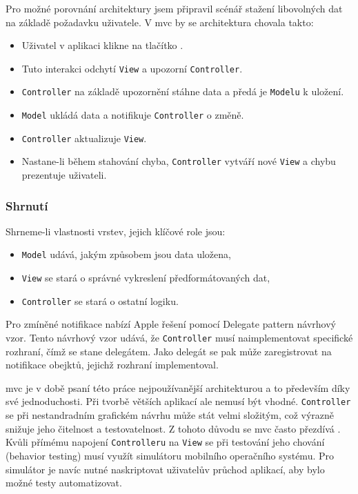 Pro možné porovnání architektury jsem připravil scénář stažení libovolných dat na základě požadavku uživatele.
V \acrshort{mvc} by se architektura chovala takto:

\begin{itemize}
  \item Uživatel v aplikaci klikne na tlačítko .
  \item Tuto interakci odchytí \texttt{View} a upozorní \texttt{Controller}.
  \item \texttt{Controller} na základě upozornění stáhne data a předá je \texttt{Modelu} k uložení.
  \item \texttt{Model} ukládá data a notifikuje \texttt{Controller} o změně.
  \item \texttt{Controller} aktualizuje \texttt{View}.
  \item Nastane-li během stahování chyba, \texttt{Controller} vytváří nové \texttt{View} a chybu prezentuje uživateli.
\end{itemize}


\subsubsection*{Shrnutí}

Shrneme-li vlastnosti vrstev, jejich klíčové role jsou:

\begin{itemize}
  \item \texttt{Model} udává, jakým způsobem jsou data uložena,
  \item \texttt{View} se stará o správné vykreslení předformátovaných dat,
  \item \texttt{Controller} se stará o ostatní logiku.
\end{itemize}


Pro zmíněné notifikace nabízí Apple řešení pomocí Delegate pattern návrhový vzor.
Tento návrhový vzor udává, že \texttt{Controller} musí naimplementovat specifické rozhraní, čímž se stane delegátem.
Jako delegát se pak může zaregistrovat na notifikace obejktů, jejichž rozhraní implementoval.

\acrshort{mvc} je v době psaní této práce nejpoužívanější architekturou a to především díky své jednoduchosti.
Při tvorbě větších aplikací ale nemusí být vhodné.
\texttt{Controller} se při nestandradním grafickém návrhu může stát velmi složitým, což výrazně snižuje jeho čitelnost a testovatelnost.
Z tohoto důvodu se \acrshort{mvc} často přezdívá .
Kvůli přímému napojení \texttt{Controlleru} na \texttt{View} se při testování jeho chování (behavior testing) musí využít simulátoru mobilního operačního systému.
Pro simulátor je navíc nutné naskriptovat uživatelův průchod aplikací, aby bylo možné testy automatizovat.

